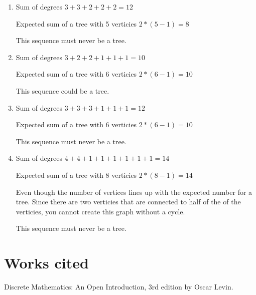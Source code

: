 \documentclass{article}
\begin{document}
\begin{enumerate}[label= (\alph*)]
    \item 
    Sum of degrees $3+3+2+2+2=12$

    Expected sum of a tree with 5 verticies $2*(5-1)=8$

    This sequence must never be a tree.
    \item
    Sum of degrees $3+2+2+1+1+1=10$

    Expected sum of a tree with 6 verticies $2*(6-1)=10$

    This sequence could be a tree.


    \item
    Sum of degrees $3+3+3+1+1+1=12$

    Expected sum of a tree with 6 verticies $2*(6-1)=10$

    This sequence must never be a tree.

    \item
    Sum of degrees $4+4+1+1+1+1+1+1=14$

    Expected sum of a tree with 8 verticies $2*(8-1)=14$

    Even though the number of vertices lines up with the expected number for a tree. Since there are two verticies that are connected to half of the of the verticies, you cannot create this graph without a cycle.

    This sequence must never be a tree.
\end{enumerate}




\section*{Works cited}
Discrete Mathematics: An Open Introduction, 3rd edition by Oscar Levin.
\end{document}
